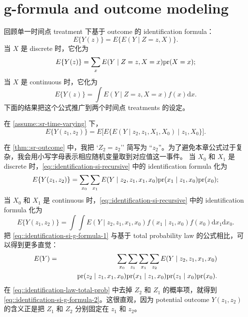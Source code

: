 \section{g-formula and outcome modeling}
\label{section:si-outcome-regression}



回顾单一时间点 treatment 下基于 outcome 的 identification formula：
$$
E\{  Y(z) \}  = E\{  E(Y\mid Z=z, X) \} .
$$
当 $X$ 是 discrete 时，它化为
$$
E\{  Y(z) \}  = \sum_x E(Y\mid Z=z, X=x) \textup{pr}(X=x) ;
$$
当 $X$ 是 continuous 时，它化为
$$
E\{  Y(z) \}  =  \int E(Y\mid Z=z, X=x) f (x) \text{d} x.
$$
下面的结果把这个公式推广到两个时间点 treatments 的设定。
 
 
 
 \begin{theorem}
\label{thm::sr-outcome}
在 \cref{assume::sr-time-varying} 下，
\begin{equation}\label{eq::identification-si-recursive}
E\{ Y(z_1, z_2) \} 
=  E\Big [   E\{    E(Y\mid  z_2, z_1, X_1, X_0)  \mid z_1, X_0 \}  \Big ].
\end{equation}
\end{theorem}


在 \cref{thm::sr-outcome} 中，我把 `$Z_2=z_2$'' 简写为 ``$z_2$''。为了避免本章公式过于复杂，我会用小写字母表示相应随机变量取到对应值这一事件。
当 $X_0$ 和 $X_1$ 是 discrete 时，\cref{eq::identification-si-recursive} 中的 identification formula 化为
\begin{equation}\label{eq::identification-si-g-formula-1}
E\{ Y(z_1, z_2) \}  = \sum_{x_0} \sum_{x_1} E( Y \mid  z_2, z_1, x_1,  x_0) \textup{pr}(x_1\mid    z_1, x_0) \textup{pr}(x_0);
\end{equation}
当 $X_0$ 和 $X_1$ 是 continuous 时，\cref{eq::identification-si-recursive} 中的 identification formula 化为
\begin{equation}\label{eq::identification-si-g-formula-2}
E\{ Y(z_1, z_2) \}  =  \int \int E( Y \mid  z_2,  z_1, x_1,  x_0) f(x_1\mid    z_1, x_0) f(x_0) \text{d}x_1 \text{d}x_0.
\end{equation}
把 \cref{eq::identification-si-g-formula-1} 与基于 total probability law 的公式相比，可以得到更多直觉：
\begin{eqnarray}
E(Y)  &=& \sum_{x_0} \sum_{z_1} \sum_{x_1} \sum_{z_2} E( Y \mid  z_2, z_1, x_1,  x_0)  \nonumber   \\
&& \qquad   \textup{pr}(z_2 \mid  z_1, x_1,  x_0)
\textup{pr}(x_1\mid    z_1, x_0)  \textup{pr}(z_1\mid x_0)  \textup{pr}(x_0). \label{eq::identification-law-total-prob}
\end{eqnarray}
在 \cref{eq::identification-law-total-prob} 中去掉 $Z_2$ 和 $Z_1$ 的概率项，就得到 \cref{eq::identification-si-g-formula-2}。这很直观，因为 potential outcome $Y(z_1, z_2)$ 的含义正是把 $Z_1$ 和 $Z_2$ 分别固定在 $z_1$ 和 $z_2$。


